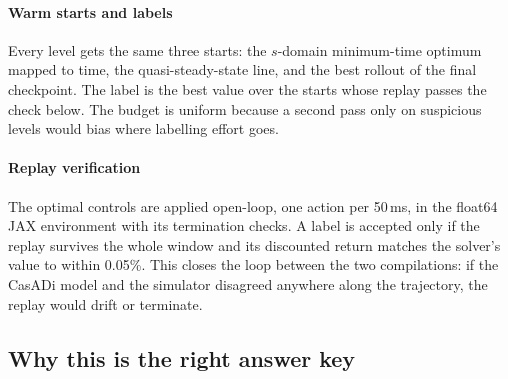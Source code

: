 \paragraph{Warm starts and labels} Every level gets the same three starts: the $s$-domain
minimum-time optimum mapped to time, the quasi-steady-state line, and the best rollout of
the final checkpoint. The label is the best value over the starts whose replay passes the
check below. The budget is uniform because a second pass only on suspicious levels would
bias where labelling effort goes.

\paragraph{Replay verification} The optimal controls are applied open-loop, one action per
50\,ms, in the float64 JAX environment with its termination checks. A label is accepted
only if the replay survives the whole window and its discounted return matches the
solver's value to within 0.05\%.
This closes the loop between the two compilations: if the CasADi model and the simulator
disagreed anywhere along the trajectory, the replay would drift or terminate.

\subsection{Why this is the right answer key}
\label{sec:answer-why}

